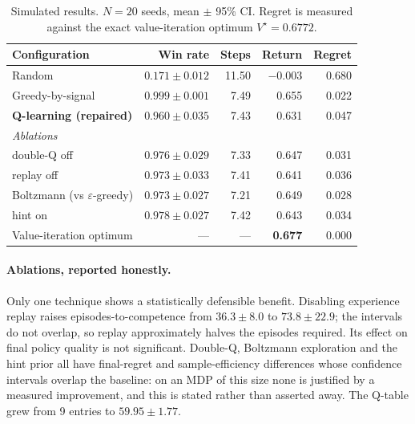 \documentclass[11pt,a4paper]{report}
\begin{document}
\begin{table}[h]
\centering
\caption{Simulated results. $N=20$ seeds, mean $\pm$ 95\% CI. Regret is measured
against the exact value-iteration optimum $V^\star = 0.6772$.}
\label{tab:sim}
\begin{tabular}{lrrrr}
\toprule
\textbf{Configuration} & \textbf{Win rate} & \textbf{Steps} & \textbf{Return} & \textbf{Regret}\\
\midrule
Random                      & $0.171 \pm 0.012$ & 11.50 & $-0.003$ & 0.680\\
Greedy-by-signal            & $0.999 \pm 0.001$ & 7.49  & 0.655 & 0.022\\
\textbf{Q-learning (repaired)} & $\mathbf{0.960 \pm 0.035}$ & 7.43 & 0.631 & 0.047\\
\midrule
\multicolumn{5}{l}{\emph{Ablations}}\\
double-Q off                & $0.976 \pm 0.029$ & 7.33 & 0.647 & 0.031\\
replay off                  & $0.973 \pm 0.033$ & 7.41 & 0.641 & 0.036\\
Boltzmann (vs $\varepsilon$-greedy) & $0.973 \pm 0.027$ & 7.21 & 0.649 & 0.028\\
hint on                     & $0.978 \pm 0.027$ & 7.42 & 0.643 & 0.034\\
\midrule
Value-iteration optimum     & --- & --- & \textbf{0.677} & 0.000\\
\bottomrule
\end{tabular}
\end{table}

\paragraph{Ablations, reported honestly.} Only one technique shows a
statistically defensible benefit. Disabling experience replay raises
episodes-to-competence from $36.3 \pm 8.0$ to $73.8 \pm 22.9$; the intervals do
not overlap, so replay approximately halves the episodes required. Its effect on
final policy quality is not significant. Double-Q, Boltzmann exploration and the
hint prior all have final-regret and sample-efficiency differences whose
confidence intervals overlap the baseline: on an MDP of this size none is
justified by a measured improvement, and this is stated rather than asserted
away. The Q-table grew from 9 entries to $59.95 \pm 1.77$.
\end{document}
